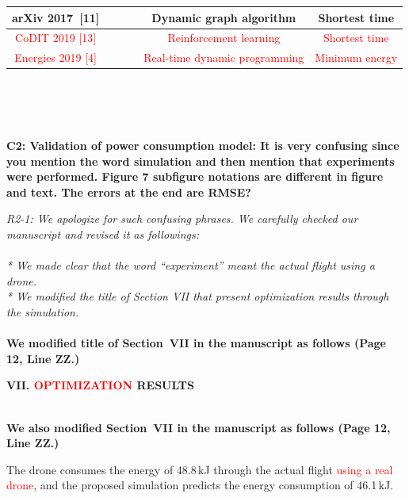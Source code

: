 \documentclass[onecolumn]{IEEEconf}
\newcommand{\cmark}{\ding{51}}%
\newcommand{\xmark}{\ding{55}}%
\begin{document}
\begin{description}
\begin{mdframed}
\begin{tabular}{|c|c|c|c|c|c|}
    \small arXiv 2017~[11] & \cmark & \cmark & %
    & \small Dynamic graph algorithm & \small Shortest time \\ \hline
    \textcolor{red}{\small CoDIT 2019 {[13]}} &  &  & %
    & \textcolor{red}{\small Reinforcement learning} & \textcolor{red}{\small Shortest time} \\ \hline
    \textcolor{red}{\small Energies 2019 {[4]}} & \textcolor{red}{\cmark} & \textcolor{red}{\cmark} 
    & \textcolor{red}{\cmark} & \textcolor{red}{\small Real-time dynamic programming} & \textcolor{red}{\small Minimum energy} \\ \hline
    \end{tabular}
    \end{mdframed}
    ~\\	
    ~\\
    ~\\
    \item \textbf
    {
	C2: Validation of power consumption model:
It is very confusing since you mention the word simulation and then mention that experiments were performed.
Figure 7 subfigure notations are different in figure and text.
The errors at the end are RMSE?
	}
	\item \textit
	{
	R2-1: We apologize for such confusing phrases. We carefully checked our manuscript and revised it as followings:~\\~\\
    * We made clear that the word “experiment” meant the actual flight using a drone.~\\
    * We modified the title of Section VII that present optimization results through the simulation.
	}
	~\\
	~\\
        \textbf{We modified title of Section~VII in the manuscript as follows (Page 12, Line ZZ.)}\\
        \begin{mdframed}[ linewidth=.75pt, userdefinedwidth=0.9\textwidth]
        \textbf{VII. \textcolor{red}{OPTIMIZATION} RESULTS}
        \end{mdframed}
	~\\
        \textbf{We also modified Section~VII in the manuscript as follows (Page 12, Line ZZ.)}\\
        \begin{mdframed}[ linewidth=.75pt, userdefinedwidth=0.9\textwidth]
    The drone consumes the energy of 48.8\,kJ through the actual flight \textcolor{red}{using a real drone}, and the proposed simulation predicts the energy consumption of 46.1\,kJ.

\end{mdframed}
\end{description}
\end{document}
